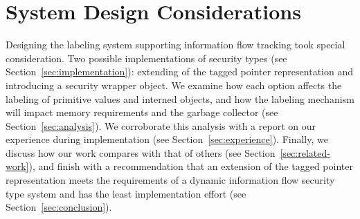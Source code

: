 
\chapter{System Design Considerations}

Designing the labeling system supporting information flow tracking took special consideration.
Two possible implementations of security types (see Section~\ref{sec:implementation}): extending of the tagged pointer representation and introducing a security wrapper object.
We examine how each option affects the labeling of primitive values and interned objects, and how the labeling mechanism will impact memory requirements and the garbage collector (see Section~\ref{sec:analysis}).
We corroborate this analysis with a report on our experience during implementation (see Section~\ref{sec:experience}).
Finally, we discuss how our work compares with that of others (see Section~\ref{sec:related-work}), and finish with a recommendation that an extension of the tagged pointer representation meets the requirements of a dynamic information flow security type system and has the least implementation effort (see Section~\ref{sec:conclusion}).


